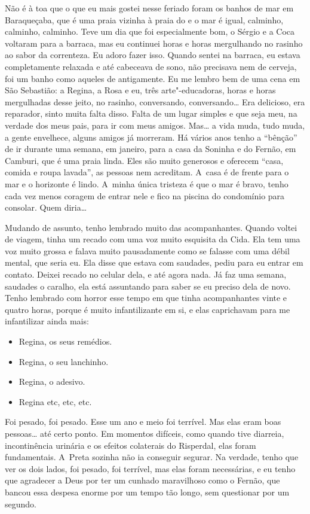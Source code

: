Não é à toa que o que eu mais gostei nesse feriado foram os banhos de
mar em Baraqueçaba, que é uma praia vizinha à praia do  e o mar é
igual, calminho, calminho, calminho. Teve um dia que foi especialmente
bom, o Sérgio e a Coca voltaram para a barraca, mas eu continuei horas e
horas mergulhando no rasinho ao sabor da correnteza. Eu adoro fazer
isso. Quando sentei na barraca, eu estava completamente relaxada e até
cabeceava de sono, não precisava nem de cerveja, foi um banho como
aqueles de antigamente. Eu me lembro bem de uma cena em São Sebastião: a
Regina, a Rosa e eu, três arte"-educadoras, horas e horas mergulhadas
desse jeito, no rasinho, conversando, conversando… Era delicioso,
era reparador, sinto muita falta disso. Falta de um lugar simples e que
seja meu, na verdade dos meus pais, para ir com meus amigos. Mas…
a vida muda, tudo muda, a gente envelhece, alguns amigos já morreram. Há
vários anos tenho a ``bênção'' de ir durante uma semana, em janeiro,
para a casa da Soninha e do Fernão, em Camburi, que é uma praia linda.
Eles são muito generosos e oferecem ``casa, comida e roupa lavada'', as
pessoas nem acreditam. A~casa é de frente para o mar e o horizonte é
lindo. A~minha única tristeza é que o mar é bravo, tenho cada vez menos
coragem de entrar nele e fico na piscina do condomínio para consolar.
Quem diria…

Mudando de assunto, tenho lembrado muito das acompanhantes. Quando
voltei de viagem, tinha um recado com uma voz muito esquisita da Cida.
Ela tem uma voz muito grossa e falava muito pausadamente como se falasse
com uma débil mental, que seria eu. Ela disse que estava com saudades,
pediu para eu entrar em contato. Deixei recado no celular dela, e até
agora nada. Já faz uma semana, saudades o caralho, ela está assuntando
para saber se eu preciso dela de novo. Tenho lembrado com horror esse
tempo em que tinha acompanhantes vinte e quatro horas, porque é muito
infantilizante em si, e elas caprichavam para me infantilizar ainda
mais:

\begin{itemize}
\item
  Regina, os seus remédios.
\item
  Regina, o seu lanchinho.
\item
  Regina, o adesivo.
\item
  Regina etc, etc, etc.
\end{itemize}
Foi pesado, foi pesado. Esse um ano e meio foi terrível. Mas elas eram
boas pessoas… até certo ponto. Em momentos difíceis, como
quando tive diarreia, incontinência urinária e os efeitos colaterais do
Risperdal, elas foram fundamentais. A~Preta sozinha não ia conseguir
segurar. Na verdade, tenho que ver os dois lados, foi pesado, foi
terrível, mas elas foram necessárias, e eu tenho que agradecer a Deus
por ter um cunhado maravilhoso como o Fernão, que bancou essa despesa
enorme por um tempo tão longo, sem questionar por um segundo.

